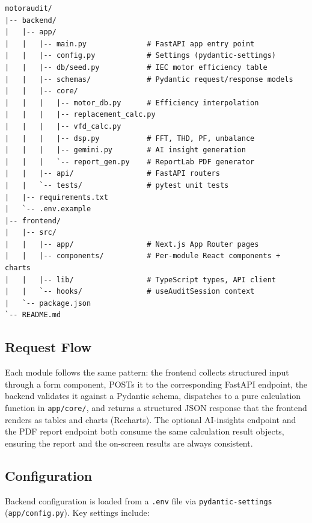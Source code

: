 \documentclass[11pt,a4paper]{article}
\begin{document}
\begin{lstlisting}[style=code]
motoraudit/
|-- backend/
|   |-- app/
|   |   |-- main.py              # FastAPI app entry point
|   |   |-- config.py            # Settings (pydantic-settings)
|   |   |-- db/seed.py           # IEC motor efficiency table
|   |   |-- schemas/             # Pydantic request/response models
|   |   |-- core/
|   |   |   |-- motor_db.py      # Efficiency interpolation
|   |   |   |-- replacement_calc.py
|   |   |   |-- vfd_calc.py
|   |   |   |-- dsp.py           # FFT, THD, PF, unbalance
|   |   |   |-- gemini.py        # AI insight generation
|   |   |   `-- report_gen.py    # ReportLab PDF generator
|   |   |-- api/                 # FastAPI routers
|   |   `-- tests/               # pytest unit tests
|   |-- requirements.txt
|   `-- .env.example
|-- frontend/
|   |-- src/
|   |   |-- app/                 # Next.js App Router pages
|   |   |-- components/          # Per-module React components + charts
|   |   |-- lib/                 # TypeScript types, API client
|   |   `-- hooks/               # useAuditSession context
|   `-- package.json
`-- README.md
\end{lstlisting}

\subsection{Request Flow}

Each module follows the same pattern: the frontend collects structured input
through a form component, POSTs it to the corresponding FastAPI endpoint, the
backend validates it against a Pydantic schema, dispatches to a pure
calculation function in \texttt{app/core/}, and returns a structured JSON
response that the frontend renders as tables and charts (Recharts). The
optional AI-insights endpoint and the PDF report endpoint both consume the
same calculation result objects, ensuring the report and the on-screen
results are always consistent.

\subsection{Configuration}

Backend configuration is loaded from a \texttt{.env} file via
\texttt{pydantic-settings} (\texttt{app/config.py}). Key settings include:
\end{document}
